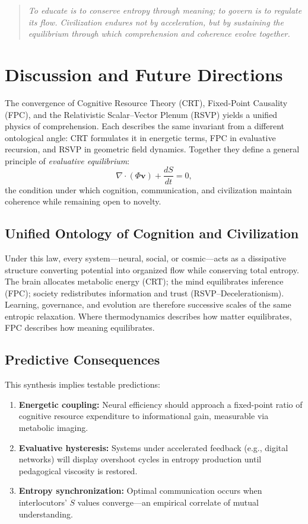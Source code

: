 \documentclass[12pt,a4paper]{article}
\begin{document}
\begin{quote}
\emph{To educate is to conserve entropy through meaning; to govern is to regulate its flow.
Civilization endures not by acceleration, but by sustaining the equilibrium through which comprehension and coherence evolve together.}
\end{quote}

\section{Discussion and Future Directions}

The convergence of Cognitive Resource Theory (CRT), Fixed-Point Causality (FPC), and the Relativistic Scalar–Vector Plenum (RSVP) yields a unified physics of comprehension.  Each describes the same invariant from a different ontological angle:  
CRT formulates it in energetic terms,  
FPC in evaluative recursion,  
and RSVP in geometric field dynamics.  
Together they define a general principle of \emph{evaluative equilibrium}:
\begin{equation}
\nabla\!\cdot(\Phi\mathbf{v})+\frac{dS}{dt}=0,
\end{equation}
the condition under which cognition, communication, and civilization maintain coherence while remaining open to novelty.

\subsection{Unified Ontology of Cognition and Civilization}

Under this law, every system—neural, social, or cosmic—acts as a dissipative structure converting potential into organized flow while conserving total entropy.
The brain allocates metabolic energy (CRT);
the mind equilibrates inference (FPC);
society redistributes information and trust (RSVP–Decelerationism).
Learning, governance, and evolution are therefore successive scales of the same entropic relaxation.
Where thermodynamics describes how matter equilibrates,  
FPC describes how meaning equilibrates.

\subsection{Predictive Consequences}

This synthesis implies testable predictions:
\begin{enumerate}[label=\arabic*., leftmargin=1.2em]
\item \textbf{Energetic coupling:} Neural efficiency should approach a fixed-point ratio of cognitive resource expenditure to informational gain, measurable via metabolic imaging.
\item \textbf{Evaluative hysteresis:} Systems under accelerated feedback (e.g., digital networks) will display overshoot cycles in entropy production until pedagogical viscosity is restored.
\item \textbf{Entropy synchronization:} Optimal communication occurs when interlocutors’ $\dot S$ values converge—an empirical correlate of mutual understanding.
\end{enumerate}
\end{document}
